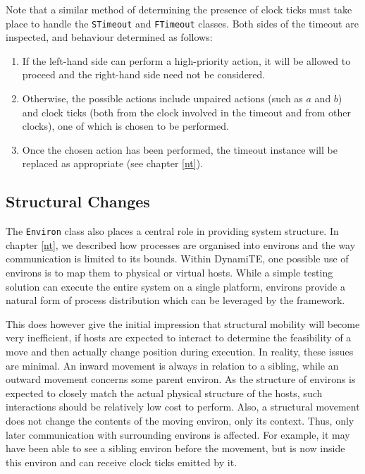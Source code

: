 Note that a similar method of determining the presence of clock ticks
must take place to handle the \texttt{STimeout} and \texttt{FTimeout}
classes.  Both sides of the timeout are inspected, and behaviour
determined as follows:
\begin{enumerate}
\item If the left-hand side can perform a high-priority action, it will
      be allowed to proceed and the right-hand side need not be
      considered.
\item Otherwise, the possible actions include unpaired actions (such as
      $a$ and $b$) and clock ticks (both from the clock involved in the
      timeout and from other clocks), one of which is chosen to be
      performed.
\item Once the chosen action has been performed, the timeout instance
      will be replaced as appropriate (see chapter \ref{nt}). 
\end{enumerate}

\subsection{Structural Changes}
\label{dyn:structchange}

The \texttt{Environ} class also places a central role in providing
system structure.  In chapter \ref{nt}, we described how
processes are organised into environs and the way communication is
limited to its bounds.  Within DynamiTE, one possible use of environs
is to map them to physical or virtual hosts.  While a simple testing
solution can execute the entire system on a single platform, environs
provide a natural form of process distribution which can be leveraged by
the framework.

This does however give the initial impression that structural mobility
will become very inefficient, if hosts are expected to interact to
determine the feasibility of a move and then actually change position
during execution.  In reality, these issues are minimal.  An inward
movement is always in relation to a sibling, while an outward movement
concerns some parent environ.  As the structure of environs is expected
to closely match the actual physical structure of the hosts, such
interactions should be relatively low cost to perform.  Also, a
structural movement does not change the contents of the moving environ,
only its context.  Thus, only later communication with surrounding
environs is affected.  For example, it may have been able to see a
sibling environ before the movement, but is now inside this environ and
can receive clock ticks emitted by it.

